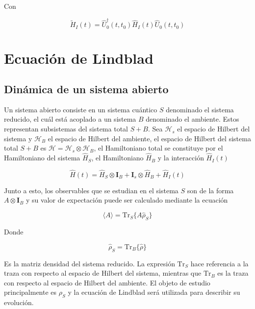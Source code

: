 Con 

\begin{equation*}
    \tilde{H}_{I}(t) = \hat{U}^{\dagger}_{0}(t,t_{0})\hat{H}_{I}(t)\hat{U}_{0}(t,t_{0})
\end{equation*}

\label{sec:closedQM}



\section{Ecuación de Lindblad}

\subsection{Dinámica de un sistema abierto}

Un sistema abierto consiste en un sistema cuántico $S$ denominado el sistema reducido, el cuál está acoplado a un sistema $B$ denominado el ambiente. Estos representan  subsistemas del sistema total $S+B$. Sea $\mathcal{H}_{s}$ el espacio de Hilbert del sistema y $\mathcal{H}_{B}$ el espacio de Hilbert del ambiente, el espacio de Hilbert del sistema total $S+B$ es  $\mathcal{H} = \mathcal{H}_{s} \otimes \mathcal{H}_{B}$, el Hamiltoniano total se constituye por el Hamiltoniano del sistema $\hat{H}_{S}$, el Hamiltoniano $\hat{H}_{B}$ y la interacción $\hat{H}_{I}(t)$

\begin{equation*}
    \hat{H}(t) = \hat{H}_{S} \otimes \mathbf{I}_{B} + \mathbf{I}_{s} \otimes \hat{H}_{B} + \hat{H}_{I}(t)
\end{equation*}

Junto a esto,  los observables que se estudian en el sistema $S$ son de la forma $A\otimes \mathbf{I}_{B}$ y su valor de expectación puede ser calculado mediante la ecuación

\begin{equation*}
    \langle A \rangle = \text{Tr}_{S}\{A \hat{\rho}_{S} \}
\end{equation*}

Donde 

\begin{equation*}
    \hat{\rho}_{S} = \text{Tr}_{B}\{ \hat{\rho} \}
\end{equation*}

Es la matriz densidad del sistema reducido. La expresión $\text{Tr}_{S}$ hace referencia a la traza con respecto al espacio de Hilbert del sistema, mientras que $\text{Tr}_{B}$  
es la traza con respecto al espacio de Hilbert del ambiente. El objeto de estudio principalmente es $\rho_{S}$ y la ecuación de Lindblad será utilizada para describir su evolución.


